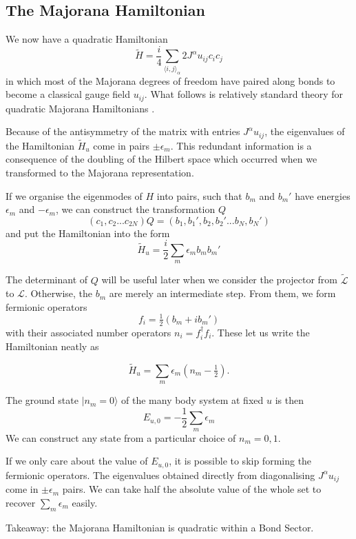\hypertarget{the-majorana-hamiltonian}{%
\subsection{The Majorana Hamiltonian}\label{the-majorana-hamiltonian}}

We now have a quadratic Hamiltonian \[ \tilde{H} =  \frac{i}{4} \sum_{\langle i,j\rangle_\alpha} 2J^{\alpha} u_{ij} c_i c_j\] in which most of the Majorana degrees of freedom have paired along bonds to become a classical gauge field \(u_{ij}\). What follows is relatively standard theory for quadratic Majorana Hamiltonians \autocite{BlaizotRipka1986}.

Because of the antisymmetry of the matrix with entries \(J^{\alpha} u_{ij}\), the eigenvalues of the Hamiltonian \(\tilde{H}_u\) come in pairs \(\pm \epsilon_m\). This redundant information is a consequence of the doubling of the Hilbert space which occurred when we transformed to the Majorana representation.

If we organise the eigenmodes of \(H\) into pairs, such that \(b_m\) and \(b_m'\) have energies \(\epsilon_m\) and \(-\epsilon_m\), we can construct the transformation \(Q\) \[(c_1, c_2... c_{2N}) Q = (b_1, b_1', b_2, b_2' ... b_{N}, b_{N}')\] and put the Hamiltonian into the form \[\tilde{H}_u = \frac{i}{2} \sum_m \epsilon_m b_m b_m'\]

The determinant of \(Q\) will be useful later when we consider the projector from \(\mathcal{\tilde{L}}\) to \(\mathcal{L}\). Otherwise, the \(b_m\) are merely an intermediate step. From them, we form fermionic operators \[ f_i = \tfrac{1}{2} (b_m + ib_m')\] with their associated number operators \(n_i = f^\dagger_i f_i\). These let us write the Hamiltonian neatly as

\[ \tilde{H}_u = \sum_m \epsilon_m (n_m - \tfrac{1}{2}).\]

The ground state \(|n_m = 0\rangle\) of the many body system at fixed \(u\) is then \[E_{u,0} = -\frac{1}{2}\sum_m \epsilon_m \] We can construct any state from a particular choice of \(n_m = 0,1\).

If we only care about the value of \(E_{u,0}\), it is possible to skip forming the fermionic operators. The eigenvalues obtained directly from diagonalising \(J^{\alpha} u_{ij}\) come in \(\pm \epsilon_m\) pairs. We can take half the absolute value of the whole set to recover \(\sum_m \epsilon_m\) easily.

Takeaway: the Majorana Hamiltonian is quadratic within a Bond Sector.

